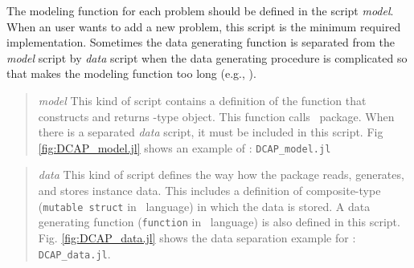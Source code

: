 The modeling function for each problem should be defined in the script \textit{model}. When an user wants to add a new problem, this script is the minimum required implementation. Sometimes the data generating function is separated from the \textit{model} script by \textit{data} script when the data generating procedure is complicated so that makes the modeling function too long (e.g., \suc).
\begin{quote}
	\noindent\textit{model} This kind of script contains a definition of the function that constructs and returns \jumpmodel-type object. This function calls \structjump\ package. When there is a separated \textit{data} script, it must be included in this script. Fig \ref{fig:DCAP_model.jl} shows an example of \dcap: \texttt{DCAP\_model.jl}
\end{quote}
\begin{quote}
	\noindent\textit{data} This kind of script defines the way how the package reads, generates, and stores instance data. This includes a definition of composite-type (\texttt{mutable struct} in \julia\ language) in which the data is stored. A data generating function (\texttt{function} in \julia\ language) is also defined in this script. Fig. \ref{fig:DCAP_data.jl} shows the data separation example for \dcap: \texttt{DCAP\_data.jl}.
\end{quote}

%
%		
%	


